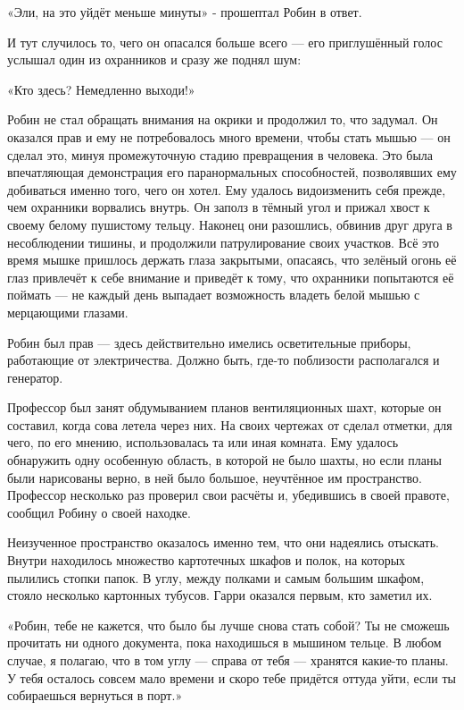 \documentclass[a5paper, 9pt,
final, openany, twoside=true]{memoir}
\begin{document}
«Эли, на это уйдёт меньше минуты» - прошептал Робин в ответ.

И тут случилось то, чего он опасался больше всего — его приглушённый голос услышал один из охранников и сразу же поднял шум:

«Кто здесь? Немедленно выходи!»

Робин не стал обращать внимания на окрики и продолжил то, что задумал. Он оказался прав и ему не потребовалось много времени, чтобы стать мышью — он сделал это, минуя промежуточную стадию превращения в человека. Это была впечатляющая демонстрация его паранормальных способностей, позволявших ему добиваться именно того, чего он хотел. Ему удалось видоизменить себя прежде, чем охранники ворвались внутрь. Он заполз в тёмный угол и прижал хвост к своему белому пушистому тельцу. Наконец они разошлись, обвинив друг друга в несоблюдении тишины, и продолжили патрулирование своих участков. Всё это время мышке пришлось держать глаза закрытыми, опасаясь, что зелёный огонь её глаз привлечёт к себе внимание и приведёт к тому, что охранники попытаются её поймать — не каждый день выпадает возможность владеть белой мышью с мерцающими глазами.

Робин был прав — здесь действительно имелись осветительные приборы, работающие от электричества. Должно быть, где-то поблизости располагался и генератор.\bigskip

Профессор был занят обдумыванием планов вентиляционных шахт, которые он составил, когда сова летела через них. На своих чертежах от сделал отметки, для чего, по его мнению, использовалась та или иная комната. Ему удалось обнаружить одну особенную область, в которой не было шахты, но если планы были нарисованы верно, в ней было большое, неучтённое им пространство. Профессор несколько раз проверил свои расчёты и, убедившись в своей правоте, сообщил Робину о своей находке.\bigskip

Неизученное пространство оказалось именно тем, что они надеялись отыскать. Внутри находилось множество картотечных шкафов и полок, на которых пылились стопки папок. В углу, между полками и самым большим шкафом, стояло несколько картонных тубусов. Гарри оказался первым, кто заметил их.

«Робин, тебе не кажется, что было бы лучше снова стать собой? Ты не сможешь прочитать ни одного документа, пока находишься в мышином тельце. В любом случае, я полагаю, что в том углу — справа от тебя — хранятся какие-то планы. У тебя осталось совсем мало времени и скоро тебе придётся оттуда уйти, если ты собираешься вернуться в порт.»
\end{document}
